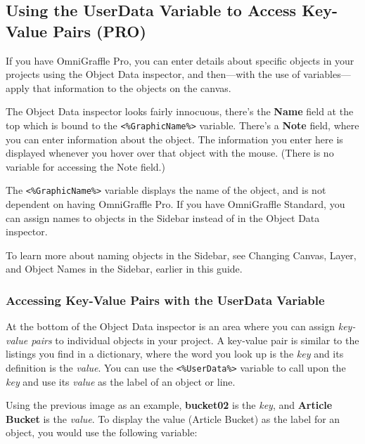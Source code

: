 \documentclass[../main.tex]{subfiles}
\begin{document}
\subsection{Using the UserData Variable to Access Key-Value Pairs
(\texorpdfstring{\textbf{PRO}}{PRO})}

\begin{ogpro}
  If you have OmniGraffle Pro, you can enter details about specific objects in your projects using
  the Object Data inspector, and then---with the use of variables---apply that information to
  the objects on the canvas.

  The Object Data inspector looks fairly innocuous, there's the \textbf{Name} field at the top
  which is bound to the \texttt{<\%GraphicName\%>} variable. There's a \textbf{Note} field,
  where you can enter information about the object. The information you enter here is
  displayed whenever you hover over that object with the mouse. (There is no variable for
  accessing the Note field.)

  The \texttt{<\%GraphicName\%>} variable displays the name of the object, and is not dependent
  on having OmniGraffle Pro. If you have OmniGraffle Standard, you can assign names to objects
  in the Sidebar instead of in the Object Data inspector.

  To learn more about naming objects in the Sidebar, see Changing Canvas, Layer, and Object
  Names in the Sidebar, earlier in this guide.

  \subsubsection{Accessing Key-Value Pairs with the UserData Variable}

  At the bottom of the Object Data inspector is an area where you can assign \textit{key-value
  pairs} to individual objects in your project. A key-value pair is similar to the listings
  you find in a dictionary, where the word you look up is the \textit{key} and its definition
  is the \textit{value}. You can use the \texttt{<\%UserData\%>} variable to call upon the
  \textit{key} and use its \textit{value} as the label of an object or line.


  Using the previous image as an example, \textbf{bucket02} is the \textit{key}, and
  \textbf{Article Bucket} is the \textit{value}. To display the value (Article Bucket) as the
  label for an object, you would use the following variable:


\end{ogpro}
\end{document}
